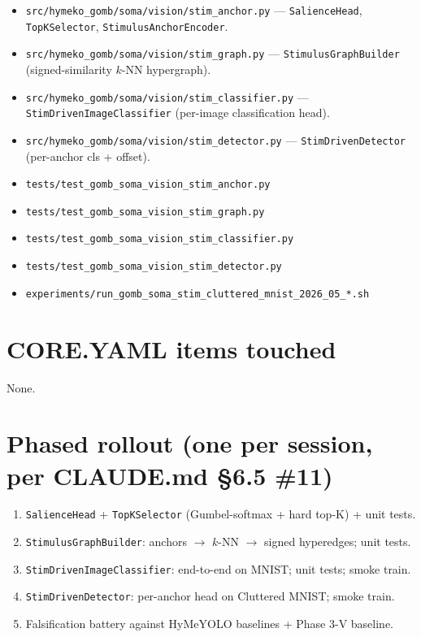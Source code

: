 \documentclass[11pt,a4paper]{article}
\begin{document}
\begin{itemize}
\item \texttt{src/hymeko\_gomb/soma/vision/stim\_anchor.py} ---
  \texttt{SalienceHead}, \texttt{TopKSelector},
  \texttt{StimulusAnchorEncoder}.
\item \texttt{src/hymeko\_gomb/soma/vision/stim\_graph.py} ---
  \texttt{StimulusGraphBuilder} (signed-similarity $k$-NN hypergraph).
\item \texttt{src/hymeko\_gomb/soma/vision/stim\_classifier.py} ---
  \texttt{StimDrivenImageClassifier} (per-image classification head).
\item \texttt{src/hymeko\_gomb/soma/vision/stim\_detector.py} ---
  \texttt{StimDrivenDetector} (per-anchor cls + offset).
\item \texttt{tests/test\_gomb\_soma\_vision\_stim\_anchor.py}
\item \texttt{tests/test\_gomb\_soma\_vision\_stim\_graph.py}
\item \texttt{tests/test\_gomb\_soma\_vision\_stim\_classifier.py}
\item \texttt{tests/test\_gomb\_soma\_vision\_stim\_detector.py}
\item \texttt{experiments/run\_gomb\_soma\_stim\_cluttered\_mnist\_2026\_05\_*.sh}
\end{itemize}

\section{CORE.YAML items touched}

None.

\section{Phased rollout (one per session, per CLAUDE.md \S6.5 \#11)}

\begin{enumerate}
\item \texttt{SalienceHead} + \texttt{TopKSelector} (Gumbel-softmax + hard top-K) + unit tests.
\item \texttt{StimulusGraphBuilder}: anchors $\to$ $k$-NN $\to$ signed hyperedges; unit tests.
\item \texttt{StimDrivenImageClassifier}: end-to-end on MNIST; unit tests; smoke train.
\item \texttt{StimDrivenDetector}: per-anchor head on Cluttered MNIST; smoke train.
\item Falsification battery against HyMeYOLO baselines + Phase 3-V baseline.
\end{enumerate}
\end{document}
